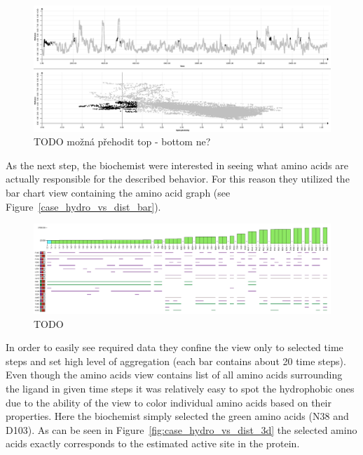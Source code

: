 \documentclass[twocolumn]{bmcart}%
\begin{document}
\begin{figure}[htb]
	\centering
  \includegraphics[width=0.95\linewidth]{img/case_hydro_distance_2.png}
  \caption{\label{fig:case_hydro_distance_2} {\color{red}TODO} možná přehodit top - bottom ne?}
\end{figure}

As the next step, the biochemist were interested in seeing what amino acids are actually responsible for the described behavior.
For this reason they utilized the bar chart view containing the amino acid graph (see Figure~\ref{case_hydro_vs_dist_bar}).

\begin{figure}[htb]
	\centering
  \includegraphics[width=0.95\linewidth]{img/case_hydro_vs_dist_bar.png}
  \caption{\label{fig:case_hydro_vs_dist_bar} {\color{red}TODO}}
\end{figure}




In order to easily see required data they confine the view only to selected time steps and set high level of aggregation (each bar contains about 20 time steps).
Even though the amino acids view contains list of all amino acids surrounding the ligand in given time steps it was relatively easy to spot the hydrophobic ones due to the ability of the view to color individual amino acids based on their properties. 
Here the biochemist simply selected the green amino acids (N38 and D103).  
As can be seen in Figure~\ref{fig:case_hydro_vs_dist_3d} the selected amino acids exactly corresponds to the estimated active site in the protein.
\end{document}
